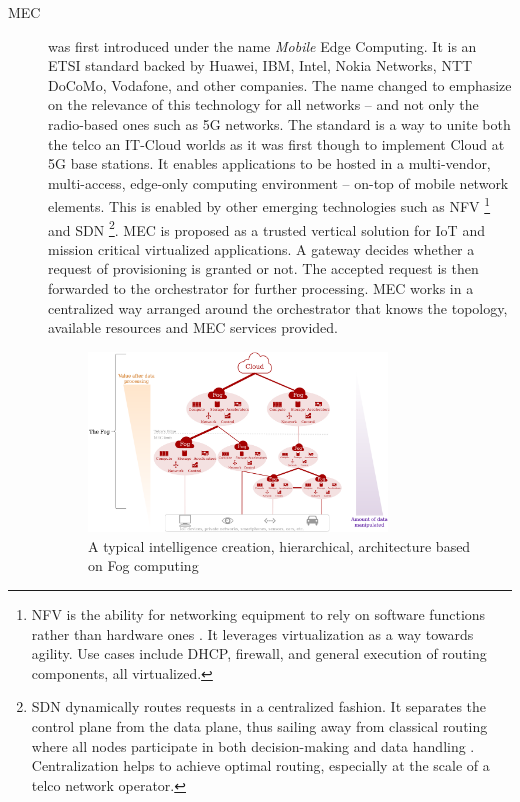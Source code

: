 \documentclass[11pt]{sdm}
\begin{document}
\begin{description}
	\item[\acrfull{MEC}] was first introduced under the name \emph{Mobile} Edge Computing. It is an \gls{ETSI} standard backed by Huawei, IBM, Intel, Nokia Networks, NTT DoCoMo, Vodafone, and other companies. The name changed to emphasize on the relevance of this technology for all networks -- and not only the radio-based ones such as 5G networks. The standard is a way to unite both the telco an IT-Cloud worlds \cite{dahmen-lhuissier_etsi_nodate-1} as it was first though to implement Cloud at 5G base stations. It enables applications to be hosted in a multi-vendor, multi-access, edge-only computing environment -- on-top of mobile network elements. This is enabled by other emerging technologies such as \gls{NFV} \footnote{\acrfull{NFV} is the ability for networking equipment to rely on software functions rather than hardware ones \cite{redhat_what_2019}. It leverages virtualization as a way towards agility. Use cases include DHCP, firewall, and general execution of routing components, all virtualized.} and \gls{SDN} \footnote{\acrfull{SDN} dynamically routes requests in a centralized fashion. It separates the control plane from the data plane, thus sailing away from classical routing where all nodes participate in both decision-making and data handling \cite{redhat_what_2019}. Centralization helps to achieve optimal routing, especially at the scale of a telco network operator.}. \gls{MEC} is proposed as a trusted vertical solution for \gls{IoT} and mission critical virtualized applications.
		A gateway decides whether a request of provisioning is granted or not. The accepted request is then forwarded to the orchestrator for further processing. \gls{MEC} works in a centralized way arranged around the orchestrator that knows the topology, available resources and \gls{MEC} services provided.

		\begin{figure}[t]
			\centering
			\includegraphics[width=0.78\textwidth]{./assets/FogArchitecture.drawio.png}
			\caption{A typical intelligence creation, hierarchical, architecture based on Fog computing \cite{ieee_standards_association_ieee_2018}}
			\label{fig:fog_archi}
		\end{figure}


\end{description}
\end{document}
